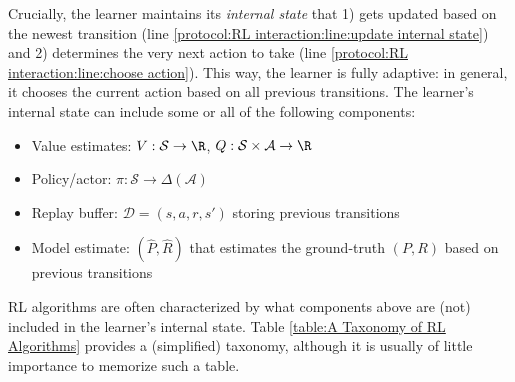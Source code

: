 Crucially, the learner maintains its {\em internal state} that 
1) gets updated based on the newest transition (line \ref{protocol:RL interaction:line:update internal state})
and 2) determines the very next action to take (line \ref{protocol:RL interaction:line:choose action}).
This way, the learner is fully adaptive: in general, it chooses the current action based on all previous transitions.
The learner's internal state can include some or all of the following components:
\begin{itemize}
    \item Value estimates: $V:\mathcal{S}\to\R$, $Q:\mathcal{S}\times\mathcal{A}\to\R$
    \item Policy/actor:  $\pi:\mathcal{S}\to\Delta(\mathcal{A})$
    \item Replay buffer: $\mathcal{D}={(s,a,r,s')}$ storing previous transitions
    \item Model estimate: $(\widehat{P}, \widehat{R})$ that estimates the ground-truth $(P,R)$ based on previous transitions
\end{itemize}
RL algorithms are often characterized by what components above are (not) included in the learner's internal state.
Table \ref{table:A Taxonomy of RL Algorithms} provides a (simplified) taxonomy, although it is usually of little importance to memorize such a table. 
